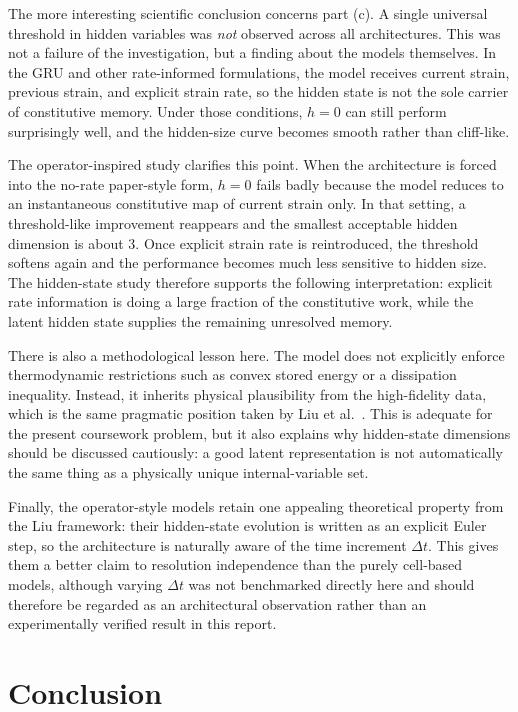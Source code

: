 \documentclass[11pt,a4paper]{article}
\newcommand{\dt}{\Delta t}
\begin{document}
The more interesting scientific conclusion concerns part (c). A single universal threshold in hidden variables was \emph{not} observed across all architectures. This was not a failure of the investigation, but a finding about the models themselves. In the GRU and other rate-informed formulations, the model receives current strain, previous strain, and explicit strain rate, so the hidden state is not the sole carrier of constitutive memory. Under those conditions, $h=0$ can still perform surprisingly well, and the hidden-size curve becomes smooth rather than cliff-like.

The operator-inspired study clarifies this point. When the architecture is forced into the no-rate paper-style form, $h=0$ fails badly because the model reduces to an instantaneous constitutive map of current strain only. In that setting, a threshold-like improvement reappears and the smallest acceptable hidden dimension is about $3$. Once explicit strain rate is reintroduced, the threshold softens again and the performance becomes much less sensitive to hidden size. The hidden-state study therefore supports the following interpretation: explicit rate information is doing a large fraction of the constitutive work, while the latent hidden state supplies the remaining unresolved memory.

There is also a methodological lesson here. The model does not explicitly enforce thermodynamic restrictions such as convex stored energy or a dissipation inequality. Instead, it inherits physical plausibility from the high-fidelity data, which is the same pragmatic position taken by Liu et al.~\cite{Liu_2023}. This is adequate for the present coursework problem, but it also explains why hidden-state dimensions should be discussed cautiously: a good latent representation is not automatically the same thing as a physically unique internal-variable set.

Finally, the operator-style models retain one appealing theoretical property from the Liu framework: their hidden-state evolution is written as an explicit Euler step, so the architecture is naturally aware of the time increment $\dt$. This gives them a better claim to resolution independence than the purely cell-based models, although varying $\dt$ was not benchmarked directly here and should therefore be regarded as an architectural observation rather than an experimentally verified result in this report.

\section{Conclusion}
\end{document}
